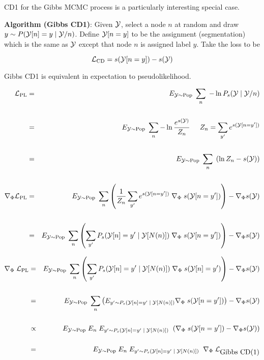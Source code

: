 {CD1 for the Gibbs MCMC process is a particularly interesting special case.

\vfill
{\bf Algorithm (Gibbs CD1)}: Given ${\cal Y}$, select a node $n$ at random and draw {\color{red} $y \sim P({\cal Y}[n]=y\;| \;{\cal Y}/n)$}. Define {\color{red} ${\cal Y}[n=y]$}
to be the assignment (segmentation) which is the same as ${\cal Y}$ except that node $n$ is assigned label $y$.  Take the loss to be

\vfill
{\color{red} $${\cal L}_{\mathrm{CD}}  = s({\cal Y}[n=y]) - s({\cal Y})$$}


Gibbs CD1 is equivalent in expectation to pseudolikelihood.

{\huge
\begin{eqnarray*}
{\cal L}_{\mathrm{PL}} & = & E_{{\cal Y} \sim \mathrm{Pop}}\;\sum_n \; - \ln P_s({\cal Y}\;|\;{\cal Y}/n) \\
\\
 & = & E_{{\cal Y} \sim \mathrm{Pop}}\;\sum_n -\ln \frac{e^{s({\cal Y})}}{Z_n}\;\;\;\;\;{Z_n = \sum_{y'} e^{s({\cal Y}[n=y'])}} \\
\\
& = & E_{{\cal Y} \sim \mathrm{Pop}}\;\sum_n\; \left(\ln Z_n - s({\cal Y})\right) \\
\\
\nabla_\Phi {\cal L}_{\mathrm{PL}} & = & E_{{\cal Y} \sim \mathrm{Pop}}\;\sum_n \left(\frac{1}{Z_n} \sum_{y'} e^{s({\cal Y}[n=y'])} \; \nabla_\Phi\;s({\cal Y}[n=y'])\right) - \nabla_\Phi s({\cal Y}) \\
\\
& = & E_{{\cal Y} \sim \mathrm{Pop}}\;\sum_n \left(\sum_{y'} P_s({\cal Y}[n]=y'\;|\;{\cal Y}[N(n)]) \; \nabla_\Phi\;s({\cal Y}[n=y'])\right) - \nabla_\Phi s({\cal Y})
\end{eqnarray*}
}


{\huge
\begin{eqnarray*}
\nabla_\Phi\;{\cal L}_{\mathrm{PL}} & = & E_{{\cal Y} \sim \mathrm{Pop}}\;\sum_n \left(\sum_{y'} P_s({\cal Y}[n]=y'\;|\;{\cal Y}[N(n)])\; \nabla_\Phi\;s({\cal Y}[n]=y')\right) - \nabla_\Phi s({\cal Y}) \\
\\
& = & E_{{\cal Y} \sim \mathrm{Pop}}\;\sum_n \left(E_{y' \sim P_s({\cal Y}[n]=y'\;|\;{\cal Y}[N(n)])} \nabla_\Phi\;s({\cal Y}[n=y'])\right) - \nabla_\Phi s({\cal Y}) \\
\\
& \propto & E_{{\cal Y} \sim \mathrm{Pop}}\;E_n\;  E_{y' \sim P_s({\cal Y}[n]=y'\;|\;{\cal Y}[N(n)])}\;\; (\nabla_\Phi\;s({\cal Y}[n=y']) - \nabla_\Phi s({\cal Y})) \\
\\
& = & E_{{\cal Y} \sim \mathrm{Pop}}\;E_n\; E_{y' \sim P_s({\cal Y}[n]=y'\;|\;{\cal Y}[N(n)])}\;\; \nabla_\Phi\;{\cal L}_{\mbox{Gibbs CD(1)}}
\end{eqnarray*}
}

}

